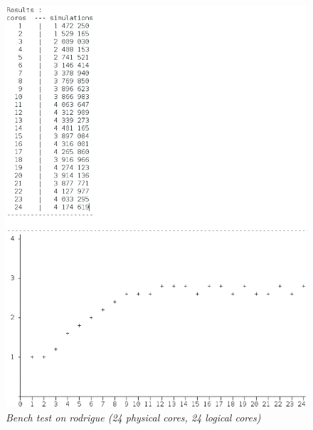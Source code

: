 \begin{figure}[H] 
\centerline{\includegraphics[width=\textwidth]{Optimisations/bench_rodrigue.png}}
\caption{\label{fig:Defrag}\textit{Bench test on rodrigue (24 physical cores, 24 logical cores)}}
\end{figure}



